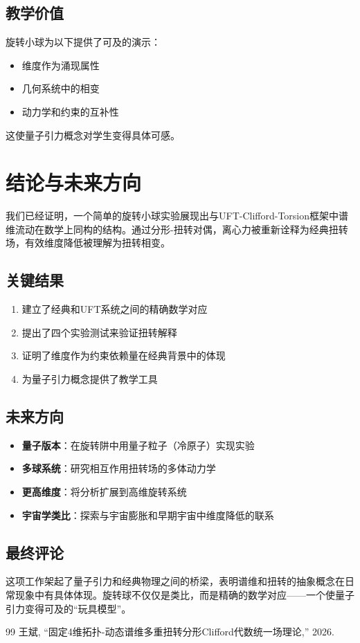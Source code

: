 \documentclass[12pt,a4paper]{article}
\begin{document}
\subsection{教学价值}

旋转小球为以下提供了可及的演示：
\begin{itemize}
    \item 维度作为涌现属性
    \item 几何系统中的相变
    \item 动力学和约束的互补性
\end{itemize}

这使量子引力概念对学生变得具体可感。

\section{结论与未来方向}
\label{sec:conclusion}

我们已经证明，一个简单的旋转小球实验展现出与UFT-Clifford-Torsion框架中谱维流动在数学上同构的结构。通过分形-扭转对偶，离心力被重新诠释为经典扭转场，有效维度降低被理解为扭转相变。

\subsection{关键结果}

\begin{enumerate}
    \item 建立了经典和UFT系统之间的精确数学对应
    \item 提出了四个实验测试来验证扭转解释
    \item 证明了维度作为约束依赖量在经典背景中的体现
    \item 为量子引力概念提供了教学工具
\end{enumerate}

\subsection{未来方向}

\begin{itemize}
    \item \textbf{量子版本}：在旋转阱中用量子粒子（冷原子）实现实验
    \item \textbf{多球系统}：研究相互作用扭转场的多体动力学
    \item \textbf{更高维度}：将分析扩展到高维旋转系统
    \item \textbf{宇宙学类比}：探索与宇宙膨胀和早期宇宙中维度降低的联系
\end{itemize}

\subsection{最终评论}

这项工作架起了量子引力和经典物理之间的桥梁，表明谱维和扭转的抽象概念在日常现象中有具体体现。旋转球不仅仅是类比，而是精确的数学对应——一个使量子引力变得可及的``玩具模型''。

\begin{thebibliography}{99}
 王斌, ``固定4维拓扑-动态谱维多重扭转分形Clifford代数统一场理论,'' 2026.
\end{thebibliography}
\end{document}

